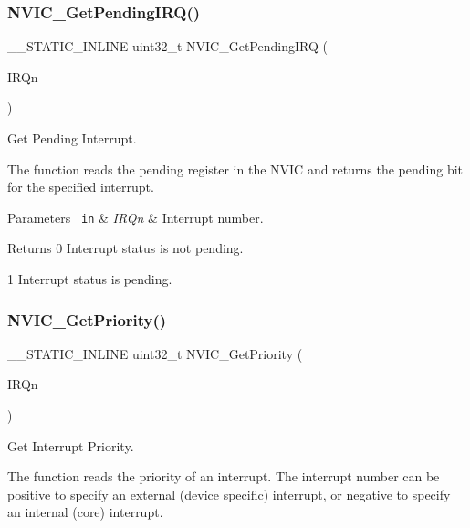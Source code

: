 \subsubsection{\texorpdfstring{NVIC\_GetPendingIRQ()}{NVIC\_GetPendingIRQ()}}
{\footnotesize\ttfamily \+\_\+\+\_\+\+S\+T\+A\+T\+I\+C\+\_\+\+I\+N\+L\+I\+NE uint32\+\_\+t N\+V\+I\+C\+\_\+\+Get\+Pending\+I\+RQ (\begin{DoxyParamCaption}\item[{\mbox{\hyperlink{group___s_a_m_d21_e15_a__cmsis_gac3af4a32370fb28c4ade8bf2add80251}{I\+R\+Qn\+\_\+\+Type}}}]{I\+R\+Qn }\end{DoxyParamCaption})}



Get Pending Interrupt. 

The function reads the pending register in the N\+V\+IC and returns the pending bit for the specified interrupt.


\begin{DoxyParams}[1]{Parameters}
\mbox{\texttt{ in}}  & {\em I\+R\+Qn} & Interrupt number.\\
\hline
\end{DoxyParams}
\begin{DoxyReturn}{Returns}
0 Interrupt status is not pending. 

1 Interrupt status is pending. 
\end{DoxyReturn}
\mbox{\label{group___c_m_s_i_s___core___n_v_i_c_functions_ga1cbaf8e6abd4aa4885828e7f24fcfeb4}} 
\subsubsection{\texorpdfstring{NVIC\_GetPriority()}{NVIC\_GetPriority()}}
{\footnotesize\ttfamily \+\_\+\+\_\+\+S\+T\+A\+T\+I\+C\+\_\+\+I\+N\+L\+I\+NE uint32\+\_\+t N\+V\+I\+C\+\_\+\+Get\+Priority (\begin{DoxyParamCaption}\item[{\mbox{\hyperlink{group___s_a_m_d21_e15_a__cmsis_gac3af4a32370fb28c4ade8bf2add80251}{I\+R\+Qn\+\_\+\+Type}}}]{I\+R\+Qn }\end{DoxyParamCaption})}



Get Interrupt Priority. 

The function reads the priority of an interrupt. The interrupt number can be positive to specify an external (device specific) interrupt, or negative to specify an internal (core) interrupt.


